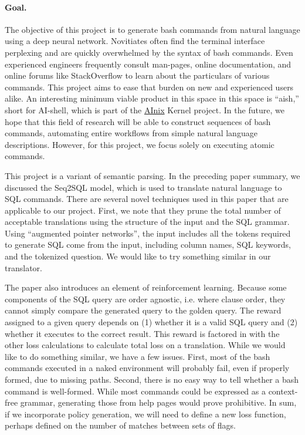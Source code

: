 \paragraph{Goal.}
The objective of this project is to generate bash commands from natural
language using a deep neural network. Novitiates often find the terminal
interface perplexing and are quickly overwhelmed by the syntax of bash
commands. Even experienced engineers frequently consult man-pages, online
documentation, and online forums like StackOverflow to learn about the
particulars of various commands. This project aims to ease that burden on new
and experienced users alike. An interesting minimum viable product in this
space in this space is ``aish,'' short for AI-shell, which is part of the
\href{http://anix.org}{AInix} Kernel project. In the future, we hope that this
field of research will be able to construct sequences of bash commands,
automating entire workflows from simple natural language descriptions. However,
for this project, we focus solely on executing atomic commands.
\par
This project is a variant of semantic parsing. In the preceding paper summary,
we discussed the Seq2SQL model, which is used to translate natural language to
SQL commands. There are several novel techniques used in this paper that are
applicable to our project. First, we note that they prune the total number of
acceptable translations using the structure of the input and the SQL grammar.
Using ``augmented pointer networks'', the input includes all the tokens
required to generate SQL come from the input, including column names, SQL
keywords, and the tokenized question. We would like to try something similar in
our translator.
\par
The paper also introduces an element of reinforcement learning. Because some
components of the SQL query are order agnostic, i.e. where clause order, they
cannot simply compare the generated query to the golden query. The reward
assigned to a given query depends on (1) whether it is a valid SQL query and
(2) whether it executes to the correct result. This reward is factored in with
the other loss calculations to calculate total loss on a translation. While we
would like to do something similar, we have a few issues. First, most of the
bash commands executed in a naked environment will probably fail, even if
properly formed, due to missing paths. Second, there is no easy way to tell
whether a bash command is well-formed. While most commands could be expressed
as a context-free grammar, generating those from help pages would prove
prohibitive. In sum, if we incorporate policy generation, we will need to
define a new loss function, perhaps defined on the number of matches between
sets of flags.

